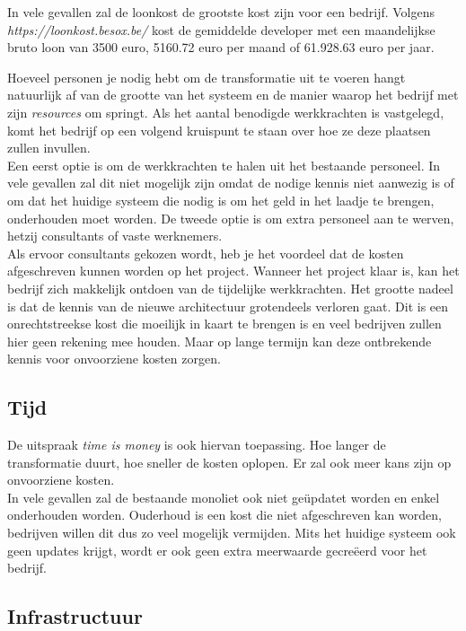 In vele gevallen zal de loonkost de grootste kost zijn voor een bedrijf. Volgens \emph{https://loonkost.besox.be/} kost de gemiddelde developer met een maandelijkse bruto loon van 3500 euro, 5160.72 euro per maand of 61.928.63 euro per jaar.

Hoeveel personen je nodig hebt om de transformatie uit te voeren hangt natuurlijk af van de grootte van het systeem en de manier waarop het bedrijf met zijn \emph{resources} om springt. 
Als het aantal benodigde werkkrachten is vastgelegd, komt het bedrijf op een volgend kruispunt te staan over hoe ze deze plaatsen zullen invullen.\\ Een eerst optie is om de werkkrachten te halen uit het bestaande personeel. In vele gevallen zal dit niet mogelijk zijn omdat de nodige kennis niet aanwezig is of om dat het huidige systeem die nodig is om het geld in het laadje te brengen, onderhouden moet worden. De tweede optie is om extra personeel aan te werven, hetzij consultants of vaste werknemers.\\ 
Als ervoor consultants gekozen wordt, heb je het voordeel dat de kosten afgeschreven kunnen worden op het project. Wanneer het project klaar is, kan het bedrijf zich makkelijk ontdoen van de tijdelijke werkkrachten.  Het grootte nadeel is dat de kennis van de nieuwe architectuur grotendeels verloren gaat. Dit is een onrechtstreekse kost die moeilijk in kaart te brengen is en veel bedrijven zullen hier geen rekening mee houden. Maar op lange termijn kan deze ontbrekende kennis voor onvoorziene kosten zorgen.

\subsection{Tijd}

De uitspraak \emph{time is money} is ook hiervan toepassing. Hoe langer de transformatie duurt, hoe sneller de kosten oplopen. Er zal ook meer kans zijn op onvoorziene kosten.\\
In vele gevallen zal de bestaande monoliet ook niet geüpdatet worden en enkel onderhouden worden. Ouderhoud is een kost die niet afgeschreven kan worden, bedrijven willen dit dus zo veel mogelijk vermijden. Mits het huidige systeem ook geen updates krijgt, wordt er ook geen extra meerwaarde gecreëerd voor het bedrijf.

\subsection{Infrastructuur}

